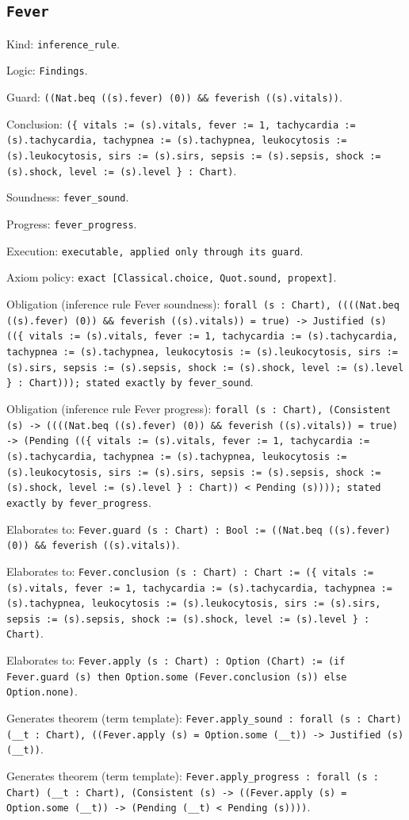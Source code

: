 \documentclass[11pt]{article}
\begin{document}
\subsection*{\texttt{Fever}}
\noindent Kind: \texttt{inference_rule}.\par
\noindent Logic: \texttt{Findings}.\par
\noindent Guard: \texttt{((Nat.beq ((s).fever) (0)) \&\& feverish ((s).vitals))}.\par
\noindent Conclusion: \texttt{(\{ vitals := (s).vitals, fever := 1, tachycardia := (s).tachycardia, tachypnea := (s).tachypnea, leukocytosis := (s).leukocytosis, sirs := (s).sirs, sepsis := (s).sepsis, shock := (s).shock, level := (s).level \} : Chart)}.\par
\noindent Soundness: \texttt{fever\_sound}.\par
\noindent Progress: \texttt{fever\_progress}.\par
\noindent Execution: \texttt{executable, applied only through its guard}.\par
\noindent Axiom policy: \texttt{exact [Classical.choice, Quot.sound, propext]}.\par
\noindent Obligation (inference rule Fever soundness): \texttt{forall (s : Chart), ((((Nat.beq ((s).fever) (0)) \&\& feverish ((s).vitals)) = true) -> Justified (s) ((\{ vitals := (s).vitals, fever := 1, tachycardia := (s).tachycardia, tachypnea := (s).tachypnea, leukocytosis := (s).leukocytosis, sirs := (s).sirs, sepsis := (s).sepsis, shock := (s).shock, level := (s).level \} : Chart))); stated exactly by fever\_sound}.\par
\noindent Obligation (inference rule Fever progress): \texttt{forall (s : Chart), (Consistent (s) -> ((((Nat.beq ((s).fever) (0)) \&\& feverish ((s).vitals)) = true) -> (Pending ((\{ vitals := (s).vitals, fever := 1, tachycardia := (s).tachycardia, tachypnea := (s).tachypnea, leukocytosis := (s).leukocytosis, sirs := (s).sirs, sepsis := (s).sepsis, shock := (s).shock, level := (s).level \} : Chart)) < Pending (s)))); stated exactly by fever\_progress}.\par
\noindent Elaborates to: \texttt{Fever.guard (s : Chart) : Bool := ((Nat.beq ((s).fever) (0)) \&\& feverish ((s).vitals))}.\par
\noindent Elaborates to: \texttt{Fever.conclusion (s : Chart) : Chart := (\{ vitals := (s).vitals, fever := 1, tachycardia := (s).tachycardia, tachypnea := (s).tachypnea, leukocytosis := (s).leukocytosis, sirs := (s).sirs, sepsis := (s).sepsis, shock := (s).shock, level := (s).level \} : Chart)}.\par
\noindent Elaborates to: \texttt{Fever.apply (s : Chart) : Option (Chart) := (if Fever.guard (s) then Option.some (Fever.conclusion (s)) else Option.none)}.\par
\noindent Generates theorem (term template): \texttt{Fever.apply\_sound : forall (s : Chart) (\_\_t : Chart), ((Fever.apply (s) = Option.some (\_\_t)) -> Justified (s) (\_\_t))}.\par
\noindent Generates theorem (term template): \texttt{Fever.apply\_progress : forall (s : Chart) (\_\_t : Chart), (Consistent (s) -> ((Fever.apply (s) = Option.some (\_\_t)) -> (Pending (\_\_t) < Pending (s))))}.\par
\end{document}
